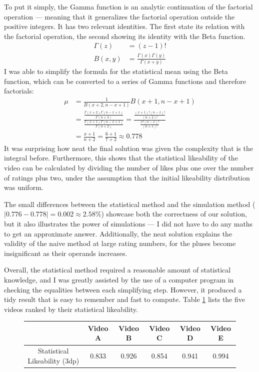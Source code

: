 \documentclass[a4paper,11pt]{article}
\begin{document}
To put it simply, the Gamma function is an analytic continuation of the factorial operation --- meaning that it generalizes the factorial operation outside the positive integers. It has two relevant identities. The first state its relation with the factorial operation, the second showing its identity with the Beta function.
\begin{align*}
    \Gamma(z) &= (z-1)!\\
    B(x, y) &= \frac{\Gamma(x) \Gamma(y)}{\Gamma(x + y)}
\end{align*}
I was able to simplify the formula for the statistical mean using the Beta function, which can be converted to a series of Gamma functions and therefore factorials:
\begin{align*}
    \mu &= \frac{1}{B(x+2, n-x+1)}B(x+1, n-x+1)\\
    &= \frac{\frac{\Gamma(x+2)\Gamma(n-x+1)}{\Gamma(n+3)}}{\frac{\Gamma(x+1)\Gamma(n-x+1)}{\Gamma(n+2)}} =  \frac{\frac{(x+1)!(n-x)!}{(n+2)!}}{\frac{x!(n-x)!}{(n+1)!}}\\
    &= \frac{x+1}{n+2} = \frac{6+1}{7+2} \approx 0.778
\end{align*}
It was surprising how neat the final solution was given the complexity that is the integral before. Furthermore, this shows that the statistical likeability of the video can be calculated by dividing the number of likes plus one over the number of ratings plus two, under the assumption that the initial likeability distribution was uniform.

The small differences between the statistical method and the simulation method ($|0.776 - 0.778| = 0.002 \approx 2.58\%$) showcase both the correctness of our solution, but it also illustrates the power of simulations --- I did not have to do any maths to get an approximate answer. Additionally, the neat solution explains the validity of the naive method at large rating numbers, for the pluses become insignificant as their operands increases.

Overall, the statistical method required a reasonable amount of statistical knowledge, and I was greatly assisted by the use of a computer program in checking the equalities between each simplifying step. However, it produced a tidy result that is easy to remember and fast to compute. Table \ref{tbl:stat} lists the five videos ranked by their statistical likeability.

\begin{figure}[H]
    \centering
    \begin{tabular}{c|c|c|c|c|c}
        & Video A & Video B & Video C & Video D & Video E \\
        \hline
        \hline
        Statistical Likeability (3dp) & 0.833 & 0.926 & 0.854 & 0.941 & 0.994
    \end{tabular}
    \label{tbl:stat}
\end{figure}
\end{document}
